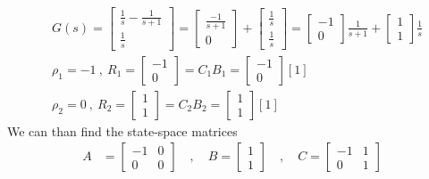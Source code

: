 \documentclass[twoside]{article}
\begin{document}
\begin{align*}
	&G(s) =  \left[ \begin{array}{cc} \frac{ 1 }{ s }  - \frac{ 1 }{ s + 1 } 
	       \\ \frac{ 1 }{ s }  \end{array} \right]  = \left[ \begin{array}{cc} \frac{ -1 }{ s + 1 } 
	       \\ 0  \end{array} \right]  + \left[ \begin{array}{cc} \frac{ 1 }{ s }  
	       \\ \frac{ 1 }{ s }  \end{array} \right] = \left[ \begin{array}{cc} -1
	       \\ 0  \end{array} \right] \frac{ 1 }{ s + 1 }  + \left[ \begin{array}{cc} 1
	       \\ 1  \end{array} \right] \frac{ 1 }{ s }  
	     \\
	  &   \rho_1 = -1 \ , \ R_1 = \left[ \begin{array}{cc} -1
	       \\ 0  \end{array} \right] = C_1 B_1 = \left[ \begin{array}{cc} -1
	       \\ 0  \end{array} \right] [1]
	       \\
	       	  &   \rho_2 = 0 \ , \ R_2 = \left[ \begin{array}{cc} 1
	       \\ 1  \end{array} \right] = C_2 B_2 = \left[ \begin{array}{cc} 1
	       \\ 1  \end{array} \right] [1]
\end{align*}
%
We can than find the state-space matrices 
%
\begin{align*}
A &= \left[ \begin{array}{ccc} -1 & 0 \\ 0 & 0  \end{array} \right]
\quad , \quad 
B = \left[ \begin{array}{c} 1 \\  1 \end{array} \right]
\quad , \quad 
	C = \left[ \begin{array}{cc} -1  & 1
	       \\  0 &  1  \end{array} \right]
\end{align*}
% 
\end{document}
